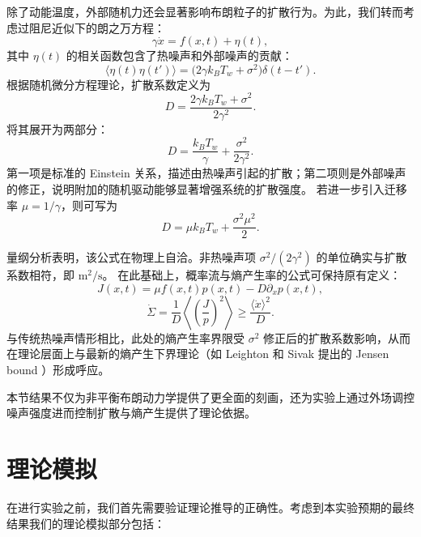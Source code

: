 \documentclass[a4paper]{report} %
\begin{document}
除了动能温度，外部随机力还会显著影响布朗粒子的扩散行为。为此，我们转而考虑过阻尼近似下的朗之万方程：
\begin{equation}
\gamma \dot{x} = f(x,t) + \eta(t),
\end{equation}
其中 $\eta(t)$ 的相关函数包含了热噪声和外部噪声的贡献：
\begin{equation}
\langle \eta(t)\eta(t') \rangle = \big( 2\gamma k_B T_w + \sigma^2 \big)\delta(t-t').
\end{equation}
根据随机微分方程理论，扩散系数定义为
\begin{equation}
D = \frac{2\gamma k_B T_w + \sigma^2}{2\gamma^2}.
\end{equation}
将其展开为两部分：
\begin{equation}
D = \frac{k_B T_w}{\gamma} + \frac{\sigma^2}{2\gamma^2}.
\end{equation}
第一项是标准的 Einstein 关系，描述由热噪声引起的扩散；第二项则是外部噪声的修正，说明附加的随机驱动能够显著增强系统的扩散强度。
若进一步引入迁移率 $\mu = 1/\gamma$，则可写为
\begin{equation}
D = \mu k_B T_w + \frac{\sigma^2 \mu^2}{2}.
\label{eq:erciguanxi}
\end{equation}\par
量纲分析表明，该公式在物理上自洽。非热噪声项 $\sigma^2/(2\gamma^2)$ 的单位确实与扩散系数相符，即 $\mathrm{m^2/s}$。  
在此基础上，概率流与熵产生率的公式可保持原有定义：
\begin{equation}
J(x,t) = \mu f(x,t)p(x,t) - D \partial_x p(x,t),
\end{equation}
\begin{equation}
\dot{\Sigma} = \frac{1}{D} \left\langle \left( \frac{J}{p} \right)^2 \right\rangle \geq \frac{\langle \dot{x} \rangle^2}{D}.
\end{equation}
与传统热噪声情形相比，此处的熵产生率界限受 $\sigma^2$ 修正后的扩散系数影响，从而在理论层面上与最新的熵产生下界理论（如 Leighton 和 Sivak 提出的 Jensen bound \cite{Leighton2024}）形成呼应。\par  
本节结果不仅为非平衡布朗动力学提供了更全面的刻画，还为实验上通过外场调控噪声强度进而控制扩散与熵产生提供了理论依据。

\chapter{理论模拟}
在进行实验之前，我们首先需要验证理论推导的正确性。考虑到本实验预期的最终结果我们的理论模拟部分包括：
\end{document}
